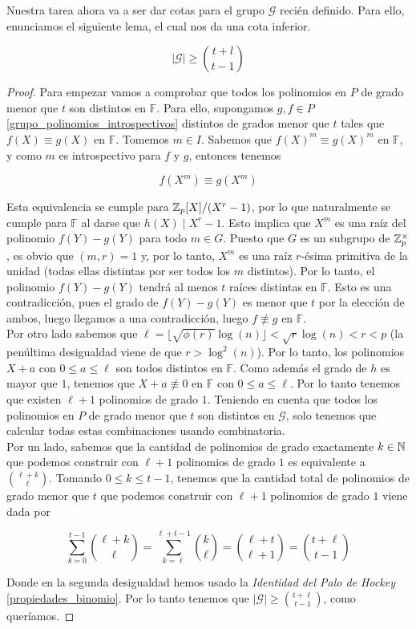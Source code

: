 Nuestra tarea ahora va a ser dar cotas para el grupo $\mathcal{G}$ recién definido. Para ello, enunciamos el siguiente lema, el cual nos da una cota inferior.

\begin{lema}\label{cota_inferior_G}
	\[ |\mathcal{G}| \geq \binom{t+l}{t-1} \]
\end{lema}

\begin{proof}
	Para empezar vamos a comprobar que todos los polinomios en $P$ de grado menor que $t$ son distintos en $\mathbb{F}$. Para ello, supongamos $g, f \in P$ \eqref{grupo_polinomios_introspectivos} distintos de grados menor que $t$ tales que $f(X) \equiv g(X)$ en $\mathbb{F}$. Tomemos $m \in I$. Sabemos que $f(X)^m \equiv g(X)^m$ en $\mathbb{F}$, y como $m$ es introspectivo para $f$ y $g$, entonces tenemos
	
	\[ f(X^m) \equiv g(X^m) \]
	
	Esta equivalencia se cumple para $\mathbb{Z}_p[X]/(X^r - 1)$, por lo que naturalmente se cumple para $\mathbb{F}$ al darse que $h(X) \mid X^r - 1$. Esto implica que $X^m$ es una raíz del polinomio $f(Y) - g(Y)$ para todo $m \in G$. Puesto que $G$ es un subgrupo de $\mathbb{Z}_p^\times$, es obvio que $(m, r) = 1$ y, por lo tanto, $X^m$ es una raíz $r$-ésima primitiva de la unidad (todas ellas distintas por ser todos los $m$ distintos). Por lo tanto, el polinomio $f(Y) - g(Y)$ tendrá al menos $t$ raíces distintas en $\mathbb{F}$. Esto es una contradicción, pues el grado de $f(Y) - g(Y)$ es menor que $t$ por la elección de ambos, luego llegamos a una contradicción, luego $f \not\equiv g$ en $\mathbb{F}$.\\
	
	Por otro lado sabemos que $\ell = \lfloor \sqrt{\phi(r)}\log(n) \rfloor < \sqrt{r}\log(n) < r < p$ (la penúltima desigualdad viene de que $r > \log^2(n)$). Por lo tanto, los polinomios $X + a$ con $0 \leq a \leq \ell$ son todos distintos en $\mathbb{F}$. Como además el grado de $h$ es mayor que $1$, tenemos que $X + a \not\equiv 0$ en $\mathbb{F}$ con $0 \leq a \leq \ell$. Por lo tanto tenemos que existen $\ell + 1$ polinomios de grado $1$. Teniendo en cuenta que todos los polinomios en $P$ de grado menor que $t$ son distintos en $\mathcal{G}$, solo tenemos que calcular todas estas combinaciones usando combinatoria.\\
	
	Por un lado, sabemos que la cantidad de polinomios de grado exactamente $k \in \mathbb{N}$ que podemos construir con $\ell + 1$ polinomios de grado $1$ es equivalente a $\binom{\ell+k}{\ell}$. Tomando $0 \leq k \leq t-1$, tenemos que la cantidad total de polinomios de grado menor que $t$ que podemos construir con $\ell + 1$ polinomios de grado $1$ viene dada por
	
	\[ \sum_{k=0}^{t-1}\binom{\ell+k}{\ell} = \sum_{k=\ell}^{\ell+t-1}\binom{k}{\ell} = \binom{\ell + t}{\ell + 1} = \binom{t + \ell}{t - 1} \]
	
	Donde en la segunda desigualdad hemos usado la \textit{Identidad del Palo de Hockey} \ref{propiedades_binomio}. Por lo tanto tenemos que $|\mathcal{G}| \geq \binom{t + \ell}{t - 1}$, como queríamos.
\end{proof}

